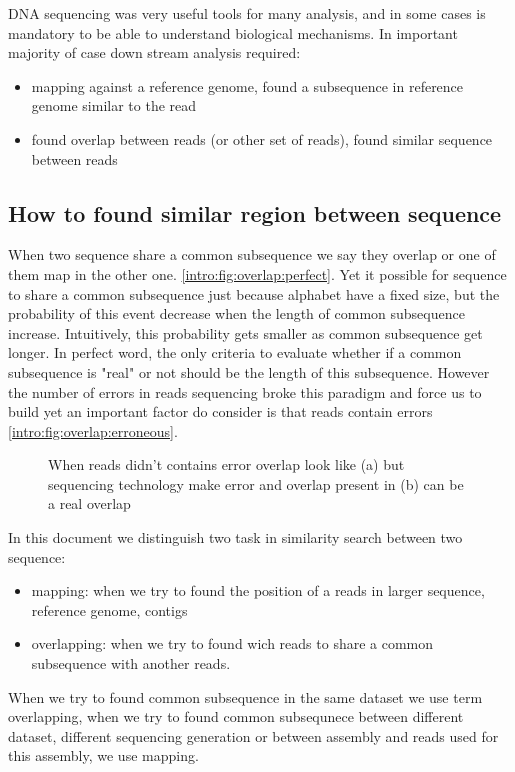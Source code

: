 \documentclass[./main.tex]{subfiles}
\begin{document}
DNA sequencing was very useful tools for many analysis, and in some cases is mandatory to be able to understand biological mechanisms. 
In important majority of case down stream analysis required:
\begin{itemize}
    \item mapping against a reference genome, found a subsequence in reference genome similar to the read
    \item found overlap between reads (or other set of reads), found similar sequence between reads 
\end{itemize}
 
\subsection{How to found similar region between sequence} 

When two sequence share a common subsequence we say they overlap or one of them map in the other one. \ref{intro:fig:overlap:perfect}. Yet it possible for sequence to share a common subsequence just because alphabet have a fixed size, but the probability of this event decrease when the length of common subsequence increase. Intuitively, this probability gets smaller as common subsequence get longer. In perfect word, the only criteria to evaluate whether if a common subsequence is "real" or not should be the length of this subsequence. However the number of errors in reads sequencing broke this paradigm and force us to build yet an important factor do consider is that reads contain errors \ref{intro:fig:overlap:erroneous}.

\begin{figure}[ht]
    \centering
    \caption{When reads didn't contains error overlap look like (a) but sequencing technology make error and overlap present in (b) can be a real overlap}
    \label{intro:fig:overlap}
\end{figure}

In this document we distinguish two task in similarity search between two sequence:
\begin{itemize}
    \item mapping: when we try to found the position of a reads in larger sequence, reference genome, contigs
    \item overlapping: when we try to found wich reads to share a common subsequence with another reads. 
\end{itemize}
When we try to found common subsequence in the same dataset we use term overlapping, when we try to found common subsequnece between different dataset, different sequencing generation or between assembly and reads used for this assembly, we use mapping.
\end{document}

